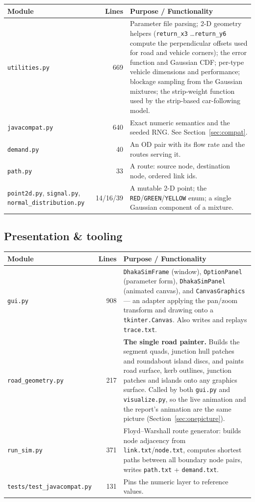 \documentclass[11pt, a4paper]{article}
\newcommand{\code}[1]{\texttt{#1}}
\begin{document}
\begin{tabularx}{\textwidth}{l r X}
\toprule
\textbf{Module} & \textbf{Lines} & \textbf{Purpose / Functionality} \\
\midrule
\code{utilities.py} & 669 & Parameter file parsing; 2-D geometry helpers (\code{return\_x3} \dots \code{return\_y6} compute the perpendicular offsets used for road and vehicle corners); the error function and Gaussian CDF; per-type vehicle dimensions and performance; blockage sampling from the Gaussian mixtures; the strip-weight function used by the strip-based car-following model. \\
\code{javacompat.py} & 640 & Exact numeric semantics and the seeded RNG. See Section~\ref{sec:compat}. \\
\code{demand.py} & 40 & An OD pair with its flow rate and the routes serving it. \\
\code{path.py} & 33 & A route: source node, destination node, ordered link ids. \\
\code{point2d.py}, \code{signal.py}, \code{normal\_distribution.py} & 14/16/39 & A mutable 2-D point; the \code{RED}/\code{GREEN}/\code{YELLOW} enum; a single Gaussian component of a mixture. \\
\bottomrule
\end{tabularx}

\subsection{Presentation \& tooling}

\begin{tabularx}{\textwidth}{l r X}
\toprule
\textbf{Module} & \textbf{Lines} & \textbf{Purpose / Functionality} \\
\midrule
\code{gui.py} & 908 & \code{DhakaSimFrame} (window), \code{OptionPanel} (parameter form), \code{DhakaSimPanel} (animated canvas), and \code{CanvasGraphics} --- an adapter applying the pan/zoom transform and drawing onto a \code{tkinter.Canvas}. Also writes and replays \code{trace.txt}. \\
\code{road\_geometry.py} & 217 & \textbf{The single road painter.} Builds the segment quads, junction hull patches and roundabout island discs, and paints road surface, kerb outlines, junction patches and islands onto any graphics surface. Called by both \code{gui.py} and \code{visualize.py}, so the live animation and the report's animation are the same picture (Section~\ref{sec:onepicture}). \\
\code{run\_sim.py} & 371 & Floyd--Warshall route generator: builds node adjacency from \code{link.txt}/\code{node.txt}, computes shortest paths between all boundary node pairs, writes \code{path.txt} + \code{demand.txt}. \\
\code{tests/test\_javacompat.py} & 131 & Pins the numeric layer to reference values. \\
\bottomrule
\end{tabularx}
\end{document}
